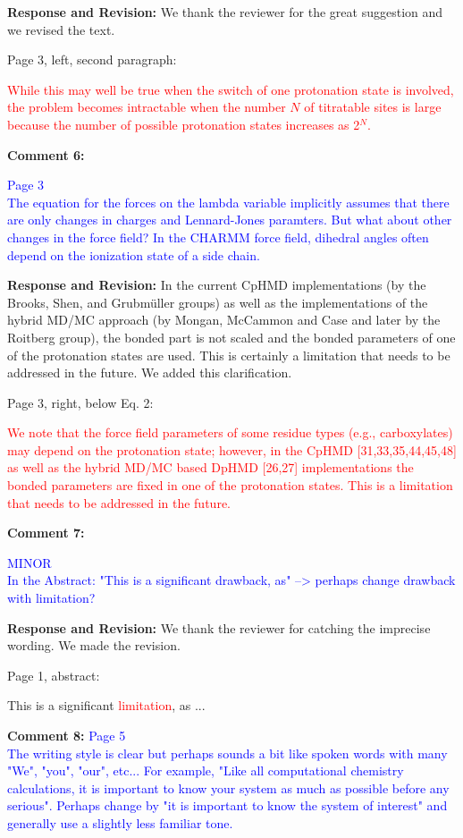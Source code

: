 \documentclass[11pt,letterpaper]{businessletter}
\begin{document}
\begin{letter}
\textbf{Response and Revision:} We thank the reviewer for the great suggestion and we revised the text.

Page 3, left, second paragraph:

\textcolor{red}{
While this may well be true when the switch of one protonation state is involved, the problem becomes intractable when 
the number $N$ of titratable sites is large because
the number of possible protonation states increases as 2$^N$.
}


\textbf{Comment 6:}

\textcolor{Blue}{
Page 3 \\
The equation for the forces on the lambda variable implicitly assumes that there are only changes in charges and Lennard-Jones paramters. But what about other changes in the force field? 
In the CHARMM force field, dihedral angles often depend on the ionization state of a side chain.
}

\textbf{Response and Revision:} 
In the current CpHMD implementations (by the Brooks, Shen, and Grubm\"{u}ller groups) as well as the implementations of the hybrid MD/MC approach (by Mongan, McCammon and Case and later by the Roitberg group), the bonded part is not scaled and the bonded parameters of one of the protonation states are used.
This is certainly a limitation that needs to be addressed in the future. 
We added this clarification.

Page 3, right, below Eq. 2:

\textcolor{red}{
We note that the force field parameters of some residue types (e.g., carboxylates) may
depend on the protonation state; however, in the CpHMD [31,33,35,44,45,48]
as well as the hybrid MD/MC based DpHMD [26,27]
implementations the bonded parameters 
are fixed in one of the protonation states.
This is a limitation that needs to be addressed in the future.
}

\textbf{Comment 7:}

\textcolor{Blue}{
MINOR\\
In the Abstract: "This is a significant drawback, as" --> perhaps change drawback with limitation?
}

\textbf{Response and Revision:} 
We thank the reviewer for catching the imprecise wording.
We made the revision.

Page 1, abstract:

This is a significant 
\textcolor{red}{limitation}, as ...

\textbf{Comment 8:}
\textcolor{Blue}{
Page 5\\
The writing style is clear but perhaps sounds a bit like spoken words with many "We", "you", "our", etc... For example, "Like all computational chemistry calculations, it is important to know your system as much as possible before any serious". Perhaps change by "it is important to know the system of interest" and generally use a slightly less familiar tone.
}


\end{letter}
\end{document}
